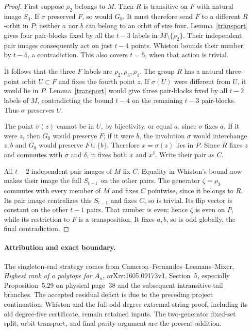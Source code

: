 \documentclass[11pt,a4paper]{article}
\begin{document}
\begin{proof}
First suppose $\rho_2$ belongs to $M$. Then $R$ is transitive on $F$
with natural image $S_4$. If $\sigma$ preserved $F$, so would $G_0$.
It must therefore send $F$ to a different $R$-orbit in $P$; neither
$a$ nor $b$ can belong to an orbit of size four. Lemma~\ref{transport}
gives four pair-blocks fixed by all the $t-3$ labels in
$M\setminus\{\rho_2\}$. Their independent pair images consequently
act on just $t-4$ points. Whiston bounds their number by $t-5$, a
contradiction. This also covers $t=5$, when that action is trivial.

It follows that the three $F$ labels are $\rho_2,\rho_3,\rho_4$.
The group $R$ has a natural three-point orbit $U\subset F$ and fixes
the fourth point $z$. If $\sigma(U)$ were different from $U$, it would
lie in $P$. Lemma~\ref{transport} would give three pair-blocks fixed
by all $t-2$ labels of $M$, contradicting the bound $t-4$ on the
remaining $t-3$ pair-blocks. Thus $\sigma$ preserves $U$.

The point $\sigma(z)$ cannot be in $U$, by bijectivity, or equal $a$,
since $\sigma$ fixes $a$. If it were $z$, then $G_0$ would preserve
$F$; if it were $b$, the involution $\sigma$ would interchange $z,b$
and $G_0$ would preserve $F\cup\{b\}$. Therefore
$x=\sigma(z)$ lies in $P$. Since $R$ fixes $z$ and commutes with
$\sigma$ and $\delta$, it fixes both $x$ and $x^\delta$.
Write their pair as $C$.

All $t-2$ independent pair images of $M$ fix $C$. Equality in Whiston's
bound now makes their image the full $S_{t-1}$ on the other pairs.
The generator $\zeta=\rho_3$ commutes with every member of $M$ and
fixes $C$ pointwise, since it belongs to $R$. Its pair image centralizes
this $S_{t-1}$ and fixes $C$, so is trivial. Its flip vector is constant
on the other $t-1$ pairs. That number is even; hence $\zeta$ is even
on $P$, while its restriction to $F$ is a transposition. It fixes $a,b$,
so is odd globally, the final contradiction.
\end{proof}

\paragraph{Attribution and exact boundary.}
The singleton-end strategy comes from Cameron--Fernandes--Leemans--Mixer,
\emph{Highest rank of a polytope for $A_n$}, arXiv:1605.09173v1,
Section~5, especially Proposition~5.29 on physical page~38 and the
subsequent intransitive-tail branches. The accepted residual deficit is
due to the preceding project continuation; Whiston and the full
odd-degree extremal-string proof, including its old degree-five
certificate, remain retained inputs. The two-generator fixed-set split,
orbit transport, and final parity argument are the present addition.
\end{document}
